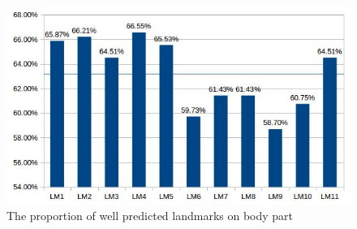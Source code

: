 \documentclass[12pt,a4paper]{article}
\begin{document}
\begin{figure}[h!]
	\centering
	\includegraphics[scale=0.7]{images/elytre}
	\caption{The proportion of well predicted landmarks on body part}
	\label{elytrefig}
\end{figure}~\\
\end{document}
